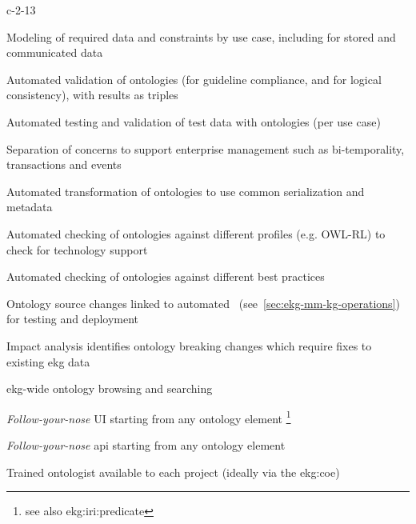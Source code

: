 \begin{level-assessment}{c-2-1}{3}

    \item Modeling of required data and constraints by use case, including for stored and communicated data
    \item Automated validation of ontologies (for guideline compliance, and for logical consistency),
          with results as triples
    \item Automated testing and validation of test data with ontologies (per use case)
    \item Separation of concerns to support enterprise management such as
          bi-temporality, transactions and events
    \item Automated transformation of ontologies to use common serialization and metadata
    \item Automated checking of ontologies against different profiles (e.g. OWL-RL)
          to check for technology support
    \item Automated checking of ontologies against different best practices
    \item Ontology source changes linked to automated~
          (see~\ref{sec:ekg-mm-kg-operations}) for testing and deployment
    \item Impact analysis identifies ontology breaking changes which require fixes to existing \gls{ekg} data
    \item \Gls{ekg}-wide ontology browsing and searching
    \item \textit{Follow-your-nose} UI starting from any
          ontology element \footnote{\label{foot:predicate-iri}see also \gls{ekg:iri:predicate}}
    \item \textit{Follow-your-nose} \gls{api} starting from any
          ontology element 
    \item Trained ontologist available to each project (ideally via the \gls{ekg:coe})

\end{level-assessment}

